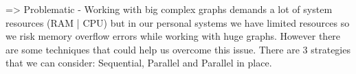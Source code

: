 => Problematic
- Working with big complex graphs demands a lot of system resources (RAM | CPU) but in our personal systems we have limited resources so we risk memory overflow errors while working with huge graphs. However there are some techniques that could help us overcome this issue. There are 3 strategies that we can consider: 
Sequential, Parallel and Parallel in place.





